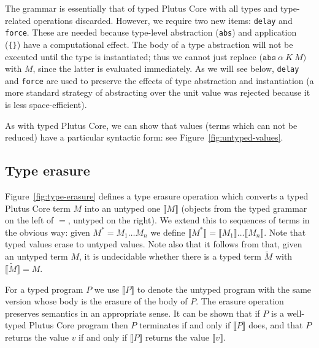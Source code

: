 \documentclass[a4paper]{article}
\newcommand{\keyword}[1]{\texttt{#1}}
\newcommand{\construct}[1]{\texttt{(} #1 \texttt{)}}
\newcommand{\abs}[3]{\construct{\keyword{abs} ~ #1 ~ #2 ~ #3}}
\newcommand{\lamU}[2]{\construct{\keyword{lam} ~ #1 ~ #2        }}
\newcommand{\appU}[2]{\texttt{[} #1 ~ #2 \texttt{]}}
\newcommand{\delay}[1]{\construct{\keyword{delay} ~ #1}}
\newcommand{\force}[1]{\construct{\keyword{force} ~ #1}}
\newcommand{\erase}[1]{\llbracket#1\rrbracket}
\begin{document}


\bigskip
\noindent The grammar is essentially that of typed Plutus Core with all types
and type-related operations discarded.  However, we require two new
items: \texttt{delay} and \texttt{force}.  These are needed because
type-level abstraction (\texttt{abs}) and application (\texttt{\{\}})
have a computational effect.  The body of a type abstraction will not
be executed until the type is instantiated; thus we cannot just
replace $\abs{\alpha}{K}{M}$ with $M$, since the latter is evaluated
immediately.  As we will see below, \texttt{delay} and \texttt{force}
are used to preserve the effects of type abstraction and
instantiation (a more standard strategy of abstracting over the unit value was
rejected because it is less space-efficient).%

As with typed Plutus Core, we can show that values (terms which can
not be reduced) have a particular syntactic form: see
Figure~\ref{fig:untyped-values}.

\subsection{Type erasure}
Figure~\ref{fig:type-erasure} defines a type erasure operation which
converts a typed Plutus Core term $M$ into an untyped one $\erase{M}$
(objects from the typed grammar on the left of $=$, untyped on the
right).  We extend this to sequences of terms in the obvious way:
given $M^* = M_1 \ldots M_n$ we define $\erase{M^*}
= \erase{M_1} \ldots \erase{M_n}$.  Note that typed values erase to
untyped values.  Note also that it follows
from \cite{Wells-96-typability} that, given an untyped term $M$, it is
undecidable whether there is a typed term $\widetilde{M}$ with $\erase{\widetilde{M}} = M$.


For a typed program $P$ we use $\erase{P}$ to denote the untyped
program with the same version whose body is the erasure of the body of
$P$. The erasure operation preserves semantics in an appropriate
sense.  It can be shown that if $P$ is a well-typed Plutus Core
program then $P$ terminates if and only if $\erase{P}$ does, and that
$P$ returns the value $v$ if and only if $\erase{P}$ returns the value
$\erase{v}$.
\end{document}

